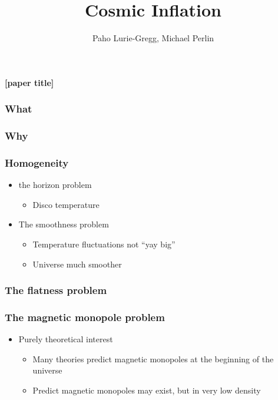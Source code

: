 \documentclass[]{beamer}
\title{Cosmic Inflation}
\author{Paho Lurie-Gregg, Michael Perlin}
\date{}
\renewcommand{\red}[1]{{\bf \color{red} #1}}
\newcommand{\fixme}[1]{\red{[#1]}}
\begin{document}
\begin{frame}
  \maketitle
  \begin{center}
    \fixme{paper title}
    \vspace{1.5in}
  \end{center}

\end{frame}


\begin{frame}
  \frametitle{What}
  
\end{frame}

\begin{frame}
  \frametitle{Why}
  
\end{frame}

\begin{frame}
  \frametitle{Homogeneity}
  \begin{itemize}
  \item the horizon problem
    \begin{itemize}
    \item Disco temperature
    \end{itemize}

  \item The smoothness problem
    \begin{itemize}
    \item Temperature fluctuations not ``yay big''
    \item Universe much smoother
    \end{itemize}

  \end{itemize}

\end{frame}


\begin{frame}
  \frametitle{The flatness problem}
  
\end{frame}

\begin{frame}
  \frametitle{The magnetic monopole problem}
  \begin{itemize}
  \item Purely theoretical interest
    \begin{itemize}
    \item Many theories predict magnetic monopoles at the beginning of the
      universe
      \item Predict magnetic monopoles may exist, but in very low density
    \end{itemize}

  \end{itemize}
\end{frame}
\end{document}
